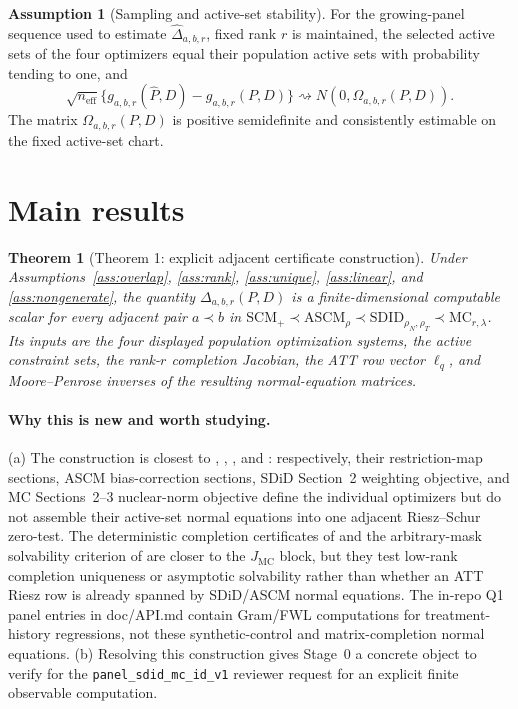 \documentclass[11pt]{article}
\theoremstyle{definition}
\newtheorem{assumption}{Assumption}
\theoremstyle{plain}
\newtheorem{theorem}{Theorem}
\theoremstyle{remark}
\begin{document}
\begin{assumption}[Sampling and active-set stability]\label{ass:sampling}
For the growing-panel sequence used to estimate
$\widehat\Delta_{a,b,r}$, fixed rank $r$ is maintained, the selected active
sets of the four optimizers equal their population active sets with
probability tending to one, and
\[
  \sqrt{n_{\mathrm{eff}}}\{g_{a,b,r}(\widehat P,D)-g_{a,b,r}(P,D)\}
  \rightsquigarrow N(0,\Omega_{a,b,r}(P,D)).
\]
The matrix $\Omega_{a,b,r}(P,D)$ is positive semidefinite and consistently
estimable on the fixed active-set chart.
\end{assumption}

\section{Main results}
\begin{theorem}[Theorem 1: explicit adjacent certificate construction]\label{thm:construction}
Under Assumptions~\ref{ass:overlap}, \ref{ass:rank}, \ref{ass:unique},
\ref{ass:linear}, and \ref{ass:nongenerate}, the quantity
$\Delta_{a,b,r}(P,D)$ is a finite-dimensional computable scalar for every
adjacent pair
$a\prec b$ in
$\mathrm{SCM}_{+}\prec \mathrm{ASCM}_{\rho}\prec
\mathrm{SDID}_{\rho_N,\rho_T}\prec \mathrm{MC}_{r,\lambda}$. Its inputs are
the four displayed population optimization systems, the active constraint
sets, the rank-$r$ completion Jacobian, the ATT row vector $\ell_q$, and
Moore--Penrose inverses of the resulting normal-equation matrices.
\end{theorem}
\paragraph{Why this is new and worth studying.}
(a) The construction is closest to \citet{DoudchenkoImbens2016},
\citet{BenMichaelFellerRothstein2021},
\citet{ArkhangelskyAtheyHirshbergImbensWager2021}, and
\citet{AtheyBayatiDoudchenkoImbensKhosravi2021}: respectively, their
restriction-map sections, ASCM bias-correction sections, SDiD Section~2
weighting objective, and MC Sections~2--3 nuclear-norm objective define the
individual optimizers but do not assemble their active-set normal equations
into one adjacent Riesz--Schur zero-test. The deterministic completion
certificates of \citet[Section~2]{SingerCucuringu2010} and the arbitrary-mask
solvability criterion of \citet[main theorem]{Chatterjee2020} are closer to
the $J_{\mathrm{MC}}$ block, but they test low-rank completion uniqueness or
asymptotic solvability rather than whether an ATT Riesz row is already
spanned by SDiD/ASCM normal equations. The in-repo Q1 panel entries in doc/API.md
contain Gram/FWL computations for treatment-history regressions, not these
synthetic-control and matrix-completion normal equations. (b) Resolving this
construction gives Stage~0 a concrete object to verify for the
\texttt{panel\_sdid\_mc\_id\_v1} reviewer request for an explicit finite
observable computation.
\end{document}
